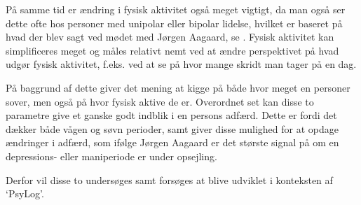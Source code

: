 På samme tid er ændring i fysisk aktivitet også meget vigtigt, da man også ser dette ofte hos personer med unipolar eller bipolar lidelse, hvilket er baseret på hvad der blev sagt ved mødet med Jørgen Aagaard, se \citep[Kapitel 1, Sektion 4]{misc:faellesrapp}. 
Fysisk aktivitet kan simplificeres meget og måles relativt nemt ved at ændre perspektivet på hvad udgør fysisk aktivitet, f.eks. ved at se på hvor mange skridt man tager på en dag.

På baggrund af dette giver det mening at kigge på både hvor meget en personer sover, men også på hvor fysisk aktive de er.
Overordnet set kan disse to parametre give et ganske godt indblik i en persons adfærd.
Dette er fordi det dækker både vågen og søvn perioder, samt giver disse mulighed for at opdage ændringer i adfærd, som ifølge Jørgen Aagaard \citep{misc:jorgen-aagaard} er det største signal på om en depressions- eller maniperiode er under opsejling. 

Derfor vil disse to undersøges samt forsøges at blive udviklet i konteksten af `PsyLog'.